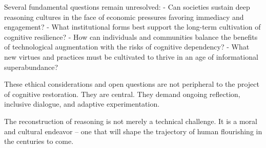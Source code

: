 Several fundamental questions remain unresolved: - Can societies sustain
deep reasoning cultures in the face of economic pressures favoring
immediacy and engagement? - What institutional forms best support the
long-term cultivation of cognitive resilience? - How can individuals and
communities balance the benefits of technological augmentation with the
risks of cognitive dependency? - What new virtues and practices must be
cultivated to thrive in an age of informational superabundance?

These ethical considerations and open questions are not peripheral to
the project of cognitive restoration. They are central. They demand
ongoing reflection, inclusive dialogue, and adaptive experimentation.

The reconstruction of reasoning is not merely a technical challenge. It
is a moral and cultural endeavor -- one that will shape the trajectory of
human flourishing in the centuries to come.

